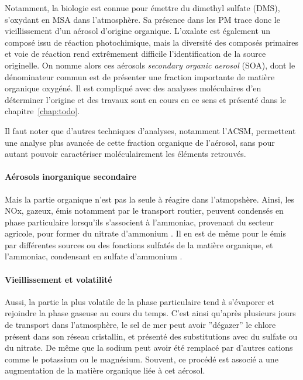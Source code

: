 Notamment, la biologie est connue pour émettre du dimethyl sulfate (DMS), s'oxydant en
MSA dans l'atmosphère. Sa présence dans les PM trace donc le vieillissement d'un aérosol
d'origine organique.  L'oxalate est également un composé issu de réaction photochimique,
mais la diversité des composés primaires et voie de réaction rend extrêmement difficile
l'identification de la source originelle.
On nomme alors ces aérosols \textit{secondary organic aerosol} (SOA), dont le
dénominateur commun est de présenter une fraction importante de matière organique
oxygéné. Il est compliqué avec des analyses moléculaires d'en déterminer l'origine et des
travaux sont en cours en ce sens et présenté dans le chapitre~\ref{chap:todo}.

Il faut noter que d'autres techniques d'analyses, notamment l'ACSM, permettent une
analyse plus avancée de cette fraction organique de l'aérosol, sans pour autant pouvoir
caractériser moléculairement les éléments retrouvés.

\paragraph{Aérosols inorganique secondaire}%
\label{par:aérosols_inorganique_secondaire}

Mais la partie organique n'est pas la seule à réagire dans l'atmopshère. Ainsi, les NOx,
gazeux, émis notamment par le transport routier, peuvent condensés en phase particulaire
lorsqu'ils s'associent à l'ammoniac, provenant du secteur agricole, pour former du
nitrate d'ammonium . Il en est de même pour le  émis par différentes
sources ou des fonctions sulfatés de la matière organique, et l'ammoniac, condensant en
sulfate d'ammonium .

\paragraph{Vieillissement et volatilité}%
\label{par:vieillissement_et_volatilité}

Aussi, la partie la plus volatile de la phase particulaire tend à s'évaporer et rejoindre
la phase gaseuse au cours du temps. C'est ainsi qu'après plusieurs jours de transport
dans l'atmosphère, le sel de mer peut avoir ''dégazer'' le chlore présent dans son réseau
cristallin, et présenté des substitutions avec du sulfate ou du nitrate. De même que la
sodium peut avoir été remplacé par d'autres cations comme le potassium ou le magnésium.
Souvent, ce procédé est associé a une augmentation de la matière organique liée à cet
aérosol.

